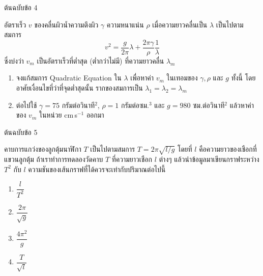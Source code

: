 \documentclass[11pt,a4paper]{article}
\newcommand{\prob}[2]{\par\vspace{12pt}{\large\bfseries #1}\hfill{\small\color{gray} #2}\par\vspace{4pt}}
\begin{document}
\clearpage\prob{MEC-0004}{ต้นฉบับข้อ 4}
อัตราเร็ว $v$ ของคลื่นผิวน้ำความตึงผิว $\gamma$ ความหนาแน่น $\rho$ เมื่อความยาวคลื่นเป็น $\lambda$ เป็นไปตามสมการ
\[v^2=\frac{g}{2\pi}\lambda+\frac{2\pi\gamma}{\rho}\frac{1}{\lambda}\]
ซึ่งบ่งว่า $v_m$ เป็นอัตราเร็วที่ต่ำสุด (ต่ำกว่าไม่มี) ที่ความยาวคลื่น $\lambda_m$
\begin{enumerate}[label=4.\arabic*.,leftmargin=1.2cm]
\item จงแก้สมการ Quadratic Equation ใน $\lambda$ เพื่อหาค่า $v_m$ ในเทอมของ $\gamma,\rho$ และ $g$ ทั้งนี้ โดยอาศัยเงื่อนไขที่ว่าที่จุดต่ำสุดนั้น รากของสมการเป็น $\lambda_1=\lambda_2=\lambda_m$
\item ต่อไปใช้ $\gamma=75$ กรัมต่อวินาที$^2$, $\rho=1$ กรัมต่อซม.$^3$ และ $g=980$ ซม.ต่อวินาที$^2$ แล้วหาค่าของ $v_m$ ในหน่วย cm\,s$^{-1}$ ออกมา
\end{enumerate}
\begin{center}\end{center}
\prob{MEC-0005}{ต้นฉบับข้อ 5}
คาบการแกว่งของลูกตุ้มนาฬิกา $T$ เป็นไปตามสมการ $T=2\pi\sqrt{l/g}$ โดยที่ $l$ คือความยาวของเชือกที่แขวนลูกตุ้ม ถ้าเราทำการทดลองวัดคาบ $T$ ที่ความยาวเชือก $l$ ต่างๆ แล้วนำข้อมูลมาเขียนกราฟระหว่าง $T^2$ กับ $l$ ความชันของเส้นกราฟที่ได้ควรจะเท่ากับปริมาณต่อไปนี้
\begin{enumerate}[label=\arabic*.,itemsep=0pt]
\item $\dfrac{l}{T^2}$ \item $\dfrac{2\pi}{\sqrt g}$ \item $\dfrac{4\pi^2}{g}$ \item $\dfrac{T}{\sqrt l}$
\end{enumerate}
\end{document}
